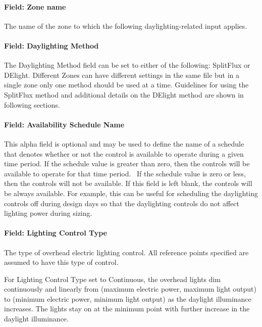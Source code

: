 \paragraph{Field: Zone name}\label{field-zone-name-003}

The name of the zone to which the following daylighting-related input applies.

\paragraph{Field: Daylighting Method}\label{field-Daylighting Method}

The Daylighting Method field can be set to either of the following: SplitFlux or DElight. Different Zones can have different settings in the same file but in a single zone only one method should be used at a time. Guidelines for using the SplitFlux method and additional details on the DElight method are shown in following sections.

\paragraph{Field: Availability Schedule Name}\label{field-availability-schedule-name-002}

This alpha field is optional and may be used to define the name of a schedule that denotes whether or not the control is available to operate during a given time period. If the schedule value is greater than zero, then the controls will be available to operate for that time period.~ If the schedule value is zero or less, then the controls will not be available. If this field is left blank, the controls will be always available. For example, this can be useful for scheduling the daylighting controls off during design days so that the daylighting controls do not affect lighting power during sizing.

\paragraph{Field: Lighting Control Type}\label{field-lighting-control-type}

The type of overhead electric lighting control. All reference points specified are assumed to have this type of control.

For Lighting Control Type set to Continuous, the overhead lights dim continuously and linearly from (maximum electric power, maximum light output) to (minimum electric power, minimum light output) as the daylight illuminance increases. The lights stay on at the minimum point with further increase in the daylight illuminance.

